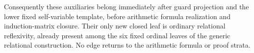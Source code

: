 Consequently these auxiliaries belong immediately after guard
projection and the lower fixed self-variable template, before
arithmetic formula realization and induction-matrix closure.
Their only new closed leaf is ordinary relational reflexivity,
already present among the six fixed ordinal leaves of the generic
relational construction.  No edge returns to the arithmetic
formula or proof strata.
